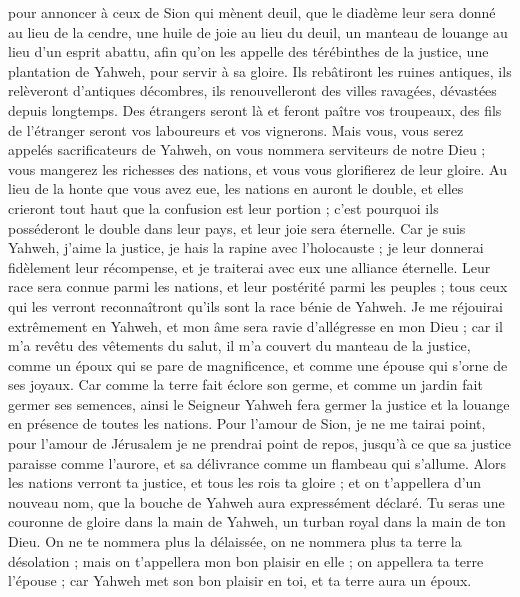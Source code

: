 \begin{multicols}{2}
pour annoncer à ceux de Sion qui mènent deuil, que le diadème leur sera donné au lieu de la cendre, une huile de joie au lieu du deuil, un manteau de louange au lieu d'un esprit abattu, afin qu'on les appelle des térébinthes de la justice, une plantation de Yahweh, pour servir à sa gloire.
Ils rebâtiront les ruines antiques, ils relèveront d'antiques décombres, ils renouvelleront des villes ravagées, dévastées depuis longtemps.
Des étrangers seront là et feront paître vos troupeaux, des fils de l'étranger seront vos laboureurs et vos vignerons.
Mais vous, vous serez appelés sacrificateurs de Yahweh, on vous nommera serviteurs de notre Dieu ; vous mangerez les richesses des nations, et vous vous glorifierez de leur gloire.
Au lieu de la honte que vous avez eue, les nations en auront le double, et elles crieront tout haut que la confusion est leur portion ; c'est pourquoi ils posséderont le double dans leur pays, et leur joie sera éternelle.
Car je suis Yahweh, j'aime la justice, je hais la rapine avec l'holocauste ; je leur donnerai fidèlement leur récompense, et je traiterai avec eux une alliance éternelle.
Leur race sera connue parmi les nations, et leur postérité parmi les peuples ; tous ceux qui les verront reconnaîtront qu'ils sont la race bénie de Yahweh.
Je me réjouirai extrêmement en Yahweh, et mon âme sera ravie d'allégresse en mon Dieu ; car il m'a revêtu des vêtements du salut, il m'a couvert du manteau de la justice, comme un époux qui se pare de magnificence, et comme une épouse qui s'orne de ses joyaux.
Car comme la terre fait éclore son germe, et comme un jardin fait germer ses semences, ainsi le Seigneur Yahweh fera germer la justice et la louange en présence de toutes les nations.
\VerseOne{}Pour l'amour de Sion, je ne me tairai point, pour l'amour de Jérusalem je ne prendrai point de repos, jusqu'à ce que sa justice paraisse comme l'aurore, et sa délivrance comme un flambeau qui s'allume.
Alors les nations verront ta justice, et tous les rois ta gloire ; et on t'appellera d'un nouveau nom, que la bouche de Yahweh aura expressément déclaré.
Tu seras une couronne de gloire dans la main de Yahweh, un turban royal dans la main de ton Dieu.
On ne te nommera plus la délaissée, on ne nommera plus ta terre la désolation ; mais on t'appellera mon bon plaisir en elle ; on appellera ta terre l'épouse ; car Yahweh met son bon plaisir en toi, et ta terre aura un époux.

\end{multicols}
